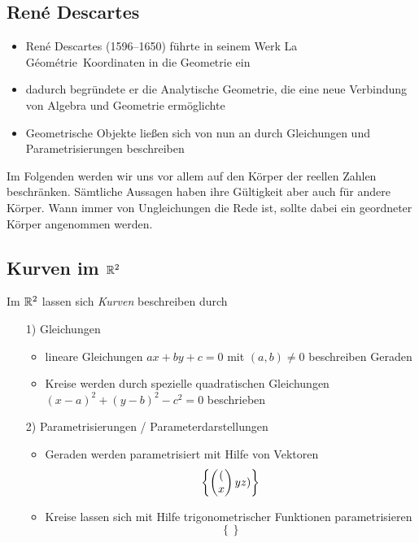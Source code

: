 \subsection*{René Descartes}

\begin{itemize}
\item René Descartes (1596--1650) führte in seinem Werk \glqq La Géométrie\grqq\ Koordinaten in die
Geometrie ein
\item dadurch begründete er die \glqq Analytische Geometrie\grqq , die eine neue Verbindung von
Algebra und Geometrie ermöglichte
\item Geometrische Objekte ließen sich von nun an durch Gleichungen und Parametrisierungen
beschreiben
\end{itemize}

Im Folgenden werden wir uns vor allem auf den Körper der reellen Zahlen beschränken. Sämtliche
Aussagen %
haben ihre Gültigkeit aber auch für andere Körper. Wann immer von Ungleichungen die Rede ist, sollte
dabei ein geordneter Körper angenommen werden.

\subsection*{Kurven im $\mathbb R^2$}

Im $\mathbb R^2$ lassen sich {\em Kurven} beschreiben durch

\begin{enumerate}
\item[1)] Gleichungen

\begin{itemize}
\item lineare Gleichungen $a x + b y + c = 0$ mit $(a,b) \not = 0$ beschreiben Geraden
\item Kreise werden durch spezielle quadratischen Gleichungen $(x-a)^2 + (y-b)^2 - c^2 = 0$
beschrieben


\end{itemize}

\item[2)] Parametrisierungen / Parameterdarstellungen

\begin{itemize}
\item Geraden werden parametrisiert mit Hilfe von Vektoren %
$$\left\{ \begin{pmatrix}{(}\\{x}\end{pmatrix}yz)\right\}$$
\item Kreise lassen sich mit Hilfe trigonometrischer Funktionen
  parametrisieren
$$
\left\{  \right\}
$$
\end{itemize}

\end{enumerate}

